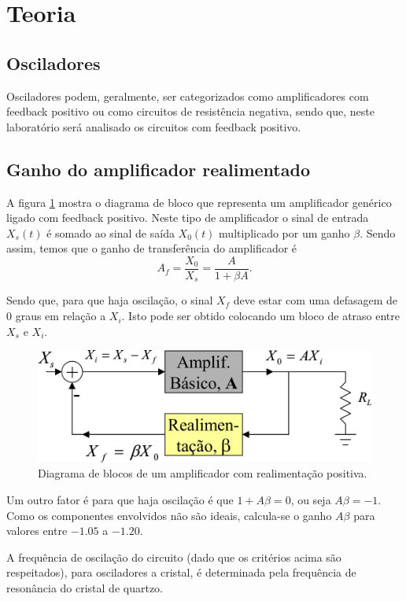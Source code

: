 \newpage
\section{Teoria}
\subsection{Osciladores}
Osciladores podem, geralmente, ser categorizados como amplificadores com feedback positivo ou como circuitos de resistência negativa, sendo que, neste laboratório será analisado os circuitos com feedback positivo.

\subsection{Ganho do amplificador realimentado}
A figura \ref{f_gain} mostra o diagrama de bloco que representa um amplificador genérico ligado com feedback positivo.
Neste tipo de amplificador o sinal de entrada $X_s(t)$ é somado ao sinal de saída $X_0(t)$ multiplicado por um ganho $\beta$. Sendo assim, temos que o ganho de transferência do amplificador é 
\[
A_f = \frac{X_0}{X_s} = \frac{A}{1+\beta A}.
\]

Sendo que, para que haja oscilação, o sinal $X_f$ deve estar com uma defasagem de 0 graus em relação a $X_i$. Isto pode ser obtido colocando um bloco de atraso entre $X_s$ e $X_i$.

\begin{figure}[H]
\centering
\includegraphics[scale=0.5]{Imagens/gain.png}
\caption{Diagrama de blocos de um amplificador com realimentação positiva.}
\label{f_gain}
\end{figure}

Um outro fator é para que haja oscilação é que $1+A\beta = 0$, ou seja $A\beta = -1$.
Como os componentes envolvidos não são ideais, calcula-se o ganho $A\beta$ para valores entre $-1.05$ a $-1.20$.

A frequência de oscilação do circuito (dado que os critérios acima são respeitados), para osciladores a cristal, é determinada pela frequência de resonância do cristal de quartzo.

